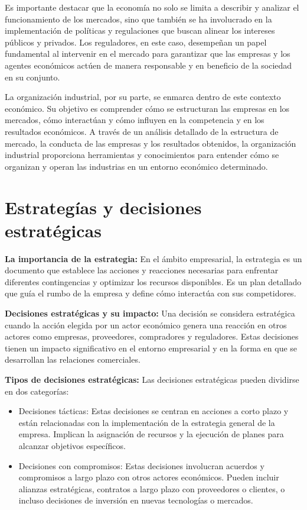 \documentclass[
  doc,
  floatsintext,
  longtable,
  a4paper,
  nolmodern,
  notxfonts,
  notimes,
  colorlinks=true,linkcolor=blue,citecolor=blue,urlcolor=blue]{apa7}
\begin{document}
Es importante destacar que la economía no solo se limita a describir y
analizar el funcionamiento de los mercados, sino que también se ha
involucrado en la implementación de políticas y regulaciones que buscan
alinear los intereses públicos y privados. Los reguladores, en este
caso, desempeñan un papel fundamental al intervenir en el mercado para
garantizar que las empresas y los agentes económicos actúen de manera
responsable y en beneficio de la sociedad en su conjunto.

La organización industrial, por su parte, se enmarca dentro de este
contexto económico. Su objetivo es comprender cómo se estructuran las
empresas en los mercados, cómo interactúan y cómo influyen en la
competencia y en los resultados económicos. A través de un análisis
detallado de la estructura de mercado, la conducta de las empresas y los
resultados obtenidos, la organización industrial proporciona
herramientas y conocimientos para entender cómo se organizan y operan
las industrias en un entorno económico determinado.

\section{Estrategías y decisiones
estratégicas}\label{estrateguxedas-y-decisiones-estratuxe9gicas}

\textbf{La importancia de la estrategia:} En el ámbito empresarial, la
estrategia es un documento que establece las acciones y reacciones
necesarias para enfrentar diferentes contingencias y optimizar los
recursos disponibles. Es un plan detallado que guía el rumbo de la
empresa y define cómo interactúa con sus competidores.

\textbf{Decisiones estratégicas y su impacto:} Una decisión se considera
estratégica cuando la acción elegida por un actor económico genera una
reacción en otros actores como empresas, proveedores, compradores y
reguladores. Estas decisiones tienen un impacto significativo en el
entorno empresarial y en la forma en que se desarrollan las relaciones
comerciales.

\textbf{Tipos de decisiones estratégicas:} Las decisiones estratégicas
pueden dividirse en dos categorías:

\begin{itemize}
\item
  Decisiones tácticas: Estas decisiones se centran en acciones a corto
  plazo y están relacionadas con la implementación de la estrategia
  general de la empresa. Implican la asignación de recursos y la
  ejecución de planes para alcanzar objetivos específicos.
\item
  Decisiones con compromisos: Estas decisiones involucran acuerdos y
  compromisos a largo plazo con otros actores económicos. Pueden incluir
  alianzas estratégicas, contratos a largo plazo con proveedores o
  clientes, o incluso decisiones de inversión en nuevas tecnologías o
  mercados.
\end{itemize}
\end{document}
